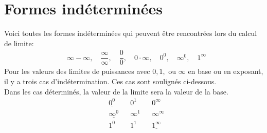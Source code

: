 \documentclass{article}
\numberwithin{equation}{section}
\begin{document}
\section{Formes indéterminées}
Voici toutes les formes indéterminées qui peuvent être rencontrées lors du calcul de limite:
\begin{align*}
	&\infty - \infty, \quad \dfrac{\infty}{\infty}, \quad \dfrac{0}{0}, \quad 0 \cdot \infty, \quad 0^0, \quad \infty^0, \quad 1^\infty
\end{align*}
Pour les valeurs des limites de puissances avec \(0, 1, \text{ ou } \infty\) en base ou en exposant, il y a trois cas d'indétermination. Ces cas sont soulignés ci-dessous. \\ Dans les cas déterminés, la valeur de la limite sera la valeur de la base.
\begin{align*}
	&\underline{0^0	}		& &0^1					& &0^\infty \\
	&\underline{\infty^0}	& &\infty^1				& &\infty^\infty \\
	&1^0						& &1^1					& &\underline{1^\infty}
\end{align*}
\end{document}
